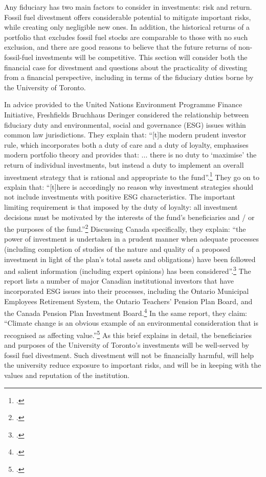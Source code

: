 	

Any fiduciary has two main factors to consider in investments: risk and return.
Fossil fuel divestment offers considerable potential to mitigate important risks, while creating only negligible new ones.
In addition, the historical returns of a portfolio that excludes fossil fuel stocks are comparable to those with no such exclusion, and there are good reasons to believe that the future returns of non-fossil-fuel investments will be competitive.
This section will consider both the financial case for divestment and questions about the practicality of divesting from a financial perspective, including in terms of the fiduciary duties borne by the University of Toronto.



In advice provided to the United Nations Environment Programme Finance Initiative, Freshfields Bruchhaus Deringer considered the relationship between fiduciary duty and environmental, social and governance (ESG) issues within common law jurisdictions.
They explain that: ``[t]he modern prudent investor rule, which incorporates both a duty of care and a duty of loyalty, emphasises modern portfolio theory and provides that: ... there is no duty to `maximise' the return of individual investments, but instead a duty to implement an overall investment strategy that is rational and appropriate to the fund''.\footcite[][p. 6]{UNEPFinanceInit}
They go on to explain that: ``[t]here is accordingly no reason why investment strategies should not include investments with positive ESG characteristics. The important limiting requirement is that imposed by the duty of loyalty: all investment decisions must be motivated by the interests of the fund's beneficiaries and / or the purposes of the fund.''\footcite[][p. 6]{UNEPFinanceInit}
Discussing Canada specifically, they explain: ``the power of investment is undertaken in a prudent manner when adequate processes (including completion of studies of the nature and quality of a proposed investment in light of the plan's total assets and obligations) have been followed and salient information (including expert opinions) has been considered''.\footcite[][p. 51]{UNEPFinanceInit}
The report lists a number of major Canadian institutional investors that have incorporated ESG issues into their processes, including the Ontario Municipal Employees Retirement System, the Ontario Teachers' Pension Plan Board, and the Canada Pension Plan Investment Board.\footcite[][p. 52]{UNEPFinanceInit}
In the same report, they claim: ``Climate change is an obvious example of an environmental consideration that is recognised as affecting value.''\footcite[][p. 11]{UNEPFinanceInit}
As this brief explains in detail, the beneficiaries and purposes of the University of Toronto's investments will be well-served by fossil fuel divestment.
Such divestment will not be financially harmful, will help the university reduce exposure to important risks, and will be in keeping with the values and reputation of the institution.



